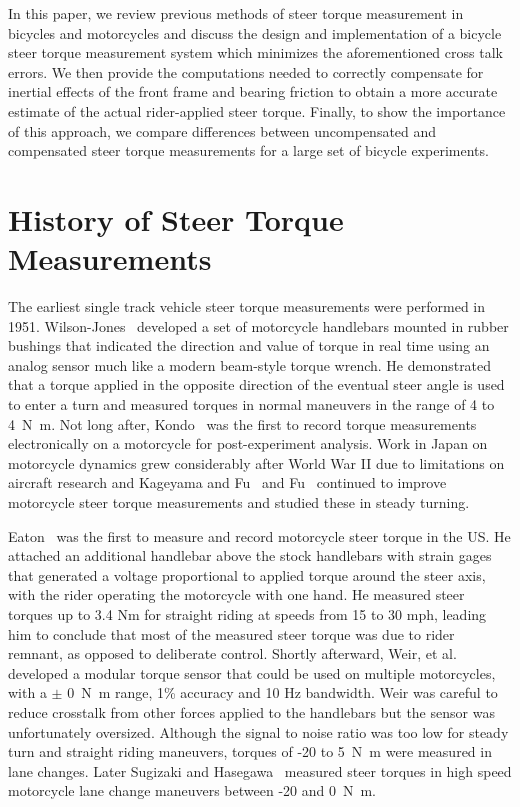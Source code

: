 \documentclass[10pt]{article}
\begin{document}
In this paper, we review previous methods of steer torque measurement in
bicycles and motorcycles and discuss the design and implementation of a bicycle
steer torque measurement system which minimizes the aforementioned cross talk
errors. We then provide the computations needed to correctly compensate for
inertial effects of the front frame and bearing friction to obtain a more
accurate estimate of the actual rider-applied steer torque. Finally, to show
the importance of this approach, we compare differences between uncompensated
and compensated steer torque measurements for a large set of bicycle
experiments.

\section*{History of Steer Torque Measurements}


The earliest single track vehicle steer torque measurements were performed in
1951. Wilson-Jones~\cite{Wilson-Jones1951} developed a set of motorcycle
handlebars mounted in rubber bushings that indicated the direction and value of
torque in real time using an analog sensor much like a modern beam-style torque
wrench. He demonstrated that a torque applied in the opposite direction of the
eventual steer angle is used to enter a turn and measured torques in normal
maneuvers in the range of 4 to \SI{4}{\newton\meter}. Not long after, Kondo~\cite{Kondo1955}
was the first to record torque measurements electronically on a motorcycle for
post-experiment analysis. Work in Japan on motorcycle dynamics grew
considerably after World War II due to limitations on aircraft research and
Kageyama and Fu~\cite{Kageyama1959} and Fu~\cite{Fu1965} continued to improve
motorcycle steer torque measurements and studied these in steady turning.


Eaton~\cite{Eaton1973} was the first to measure and record motorcycle steer
torque in the US. He attached an additional handlebar above the stock
handlebars with strain gages that generated a voltage proportional to applied
torque around the steer axis, with the rider operating the motorcycle with one
hand. He measured steer torques up to 3.4 Nm for straight riding at speeds from
15 to 30 mph, leading him to conclude that most of the measured steer torque
was due to rider remnant, as opposed to deliberate control. Shortly afterward,
Weir, et al.~\cite{Weir1979a} developed a modular torque sensor that could be
used on multiple motorcycles, with a $\pm$ \SI{0}{\newton\meter} range, 1\% accuracy and 10 Hz
bandwidth. Weir was careful to reduce crosstalk from other forces applied to
the handlebars but the sensor was unfortunately oversized. Although the signal
to noise ratio was too low for steady turn and straight riding maneuvers,
torques of -20 to \SI{5}{\newton\meter} were measured in lane changes. Later Sugizaki and
Hasegawa~\cite{Sugizaki1988} measured steer torques in high speed motorcycle
lane change maneuvers between -20 and \SI{0}{\newton\meter}.
\end{document}

